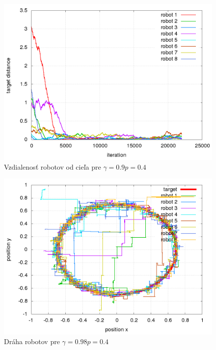 \begin{figure}[!htb]
\centering
\includegraphics[scale=.4]{../../results_q_learning/nano_q_learning/result_04_03/robot_reward.png}
\caption{Vzdialenosť robotov od cieľa pre $\gamma = 0.9 p = 0.4$}
\label{img:nano_q_result_04_3_error}
\end{figure}

\begin{figure}[!htb]
\centering
\includegraphics[scale=.4]{../../results_q_learning/nano_q_learning/result_04_04/robot_path.png}
\caption{Dráha robotov pre $\gamma = 0.98 p = 0.4$}
\label{img:nano_q_result_04_4_path}
\end{figure}

